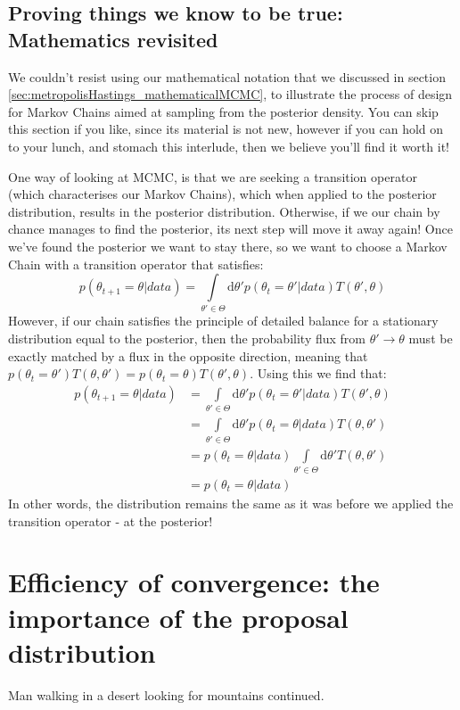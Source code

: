 \documentclass[11pt,fullpage]{book}
\begin{document}
\subsection{Proving things we know to be true: Mathematics revisited}
We couldn't resist using our mathematical notation that we discussed in section \ref{sec:metropolisHastings_mathematicalMCMC}, to illustrate the process of design for Markov Chains aimed at sampling from the posterior density. You can skip this section if you like, since its material is not new, however if you can hold on to your lunch, and stomach this interlude, then we believe you'll find it worth it!

One way of looking at MCMC, is that we are seeking a transition operator (which characterises our Markov Chains), which when applied to the posterior distribution, results in the posterior distribution\cite{chib1995understanding}. Otherwise, if we our chain by chance manages to find the posterior, its next step will move it away again! Once we've found the posterior we want to stay there, so we want to choose a Markov Chain with a transition operator that satisfies:
%
\begin{equation}
p(\theta_{t+1}=\theta|data)= \int\limits_{\theta'\in\Theta} \mathrm{d}\theta' p(\theta_t=\theta'|data) T(\theta',\theta)
\end{equation} 
%
However, if our chain satisfies the principle of detailed balance for a stationary distribution equal to the posterior, then the probability flux from $\theta'\rightarrow\theta$ must be exactly matched by a flux in the opposite direction, meaning that $p(\theta_t=\theta') T(\theta,\theta') = p(\theta_t=\theta) T(\theta',\theta)$. Using this we find that:
%
\begin{equation}
\begin{align}
p(\theta_{t+1}=\theta|data) &= \int\limits_{\theta'\in\Theta} \mathrm{d}\theta' p(\theta_t=\theta'|data) T(\theta',\theta)\\
&=\int\limits_{\theta'\in\Theta} \mathrm{d}\theta' p(\theta_t=\theta|data) T(\theta,\theta')\\
&=p(\theta_t=\theta|data) \int\limits_{\theta'\in\Theta} \mathrm{d}\theta' T(\theta,\theta')\\
&= p(\theta_t=\theta|data)
\end{align}
\end{equation}
%
In other words, the distribution remains the same as it was before we applied the transition operator - at the posterior!

\section{Efficiency of convergence: the importance of the proposal distribution}
Man walking in a desert looking for mountains continued.
\end{document}
